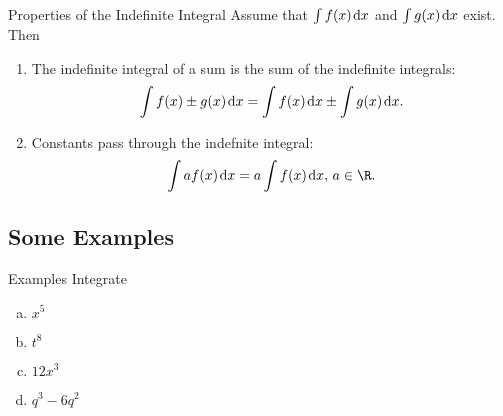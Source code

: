 \documentclass[Lecture.tex]{subfiles}
\begin{document}
\begin{frame}{Properties of the Indefinite Integral}
  Assume that $\int f(x)\!\!\;\operatorname{d}\!x$ and $\int g(x)\!\!\;\operatorname{d}\!x$ exist.
  Then
  \begin{enumerate}
  \item<2->The indefinite integral of a sum is the sum of the indefinite integrals:
    $$\int f(x) \pm g(x)\dx{x} = \int f(x)\dx{x} \pm \int g(x)\dx{x}.$$
  \item<3->Constants pass through the indefnite integral:
    $$\int af(x)\dx{x} = a\int f(x)\dx{x},\, a \in \R.$$
  \end{enumerate}
\end{frame}

\subsection{Some Examples}
\begin{frame}{Examples}
  Integrate
  \begin{multicols}{4}
  \begin{enumerate}[(a)]
  \item<alert@2-3>
    $x^5$
  \item<alert@4-5>
    $t^8$
  \item<alert@6-9>
    $12x^3$
  \item<alert@10-14>
    $q^3 - 6q^2$
  \end{enumerate}
  \end{multicols}
  \vfill
  \begin{minipage}[t]{\linewidth}
  \end{minipage}
\end{frame}
\end{document}
